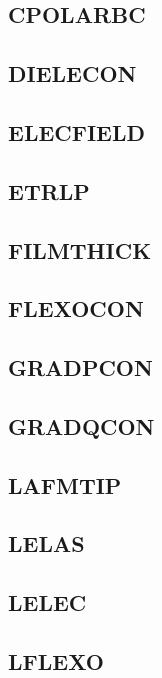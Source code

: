 \documentclass{article}
\begin{document}
\subsection{CPOLARBC }

\subsection{DIELECON }

\subsection{ELECFIELD}

\subsection{ETRLP    }

\subsection{FILMTHICK}

\subsection{FLEXOCON }

\subsection{GRADPCON }

\subsection{GRADQCON }

\subsection{LAFMTIP  }

\subsection{LELAS    }

\subsection{LELEC    }

\subsection{LFLEXO   }
\end{document}
